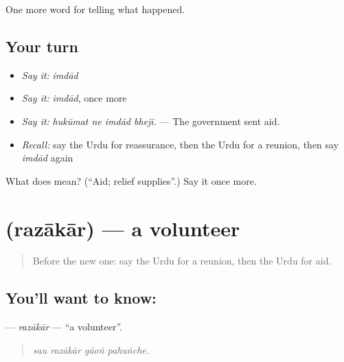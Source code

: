 \begin{grammarlens}[title={What you've built}]
One more word for telling what happened.
\end{grammarlens}

\subsection*{Your turn}
\begin{itemize}
\raggedright
  \item \emph{Say it:} \emph{imdād}
  \item \emph{Say it:} \emph{imdād}, once more
  \item \emph{Say it:} \emph{hukūmat ne imdād bhejī.} — The government sent aid.
  \item \emph{Recall:} say the Urdu for reassurance, then the Urdu for a reunion, then say \emph{imdād} again
\end{itemize}

\begin{tcolorbox}[breakable,colback=teal!4,colframe=teal!35!black,title={Before you move on}]
What does  mean? (\textquotedblleft{}Aid; relief supplies\textquotedblright{}.) Say it once more.
\end{tcolorbox}
\section[\texorpdfstring{\ur{رضاکار} (razākār)}{رضاکار (razākār)}]{ (razākār) — a volunteer}

\label{lesson:UR-C299-razakar}



\begin{quote}
Before the new one: say the Urdu for a reunion, then the Urdu for aid.
\end{quote}

\subsection*{You'll want to know: }
\textbf{} — \emph{razākār} — \textquotedblleft{}a volunteer\textquotedblright{}.

\begin{quote}
   
\end{quote}

\begin{quote}
\emph{sau razākār gāoṅ pahuṅche.}
\end{quote}

